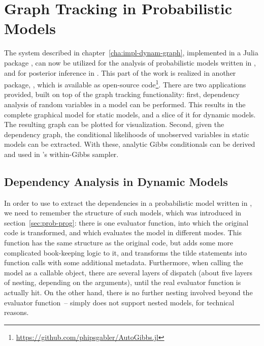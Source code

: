 \chapter{Graph Tracking in Probabilistic Models}
\label{cha:graph-track-prob}

The system described in chapter~\ref{cha:impl-dynam-graph}, implemented in a Julia package
\irtrackerjl{}, can now be utilized for the analysis of probabilistic models written in \dppljl{},
and for posterior inference in \turingjl{}.  This part of the work is realized in another package,
\autogibbsjl{}, which is available as open-source
code\footnote{\url{https://github.com/phipsgabler/AutoGibbs.jl}}.  There are two applications
provided, built on top of the graph tracking functionality: first, dependency analysis of random
variables in a model can be performed.  This results in the complete graphical model for static
models, and a slice of it for dynamic models.  The resulting graph can be plotted for visualization.
Second, given the dependency graph, the conditional likelihoods of unobserved variables in static
models can be extracted.  With these, analytic Gibbs conditionals can be derived and used in
\turingjl{}'s within-Gibbs sampler.

\section{Dependency Analysis in Dynamic Models}
\label{sec:dependency-analysis}

In order to use \irtrackerjl{} to extract the dependencies in a probabilistic model written in
\dppljl{}, we need to remember the structure of such models, which was introduced in
section~\ref{sec:prob-prog}: there is one evaluator function, into which the original code is
transformed, and which evaluates the model in different modes.  This function has the same structure
as the original code, but adds some more complicated book-keeping logic to it, and transforms the
tilde statements into function calls with some additional metadata.  Furthermore, when calling the
model as a callable object, there are several layers of dispatch (about five layers of nesting,
depending on the arguments), until the real evaluator function is actually hit.  On the other hand,
there is no further nesting involved beyond the evaluator function~-- \turingjl{} simply does not
support nested models, for technical reasons.

